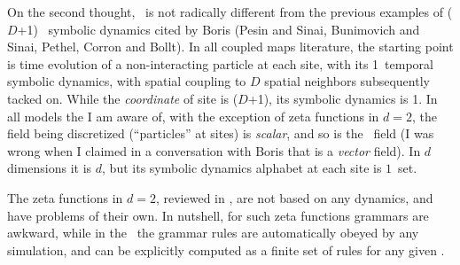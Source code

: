 \begin{description}
{On the second thought, \catlatt\ is not radically different from the previous
examples of ($D$+1)\dmn\ {\spt} symbolic dynamics cited by Boris
(Pesin and Sinai,
Bunimovich and Sinai,
Pethel, Corron and
Bollt).
In all coupled maps literature, the starting point is time evolution of a
non-interacting particle at each site, with its 1\dmn\ temporal symbolic
dynamics, with spatial coupling to $D$ spatial neighbors subsequently tacked
on. While the \emph{coordinate} of site is ($D$+1)\dmn, its symbolic dynamics
is 1\dmn. In all models the I am aware of, with the exception of zeta
functions in $d=2$, the field being discretized (``particles'' at sites) is
\emph{scalar}, and so is the \catlatt\ field (I was wrong when I claimed in a
conversation with Boris that is a \emph{vector} field). In $d$ {\spt}
dimensions it is $d$\dmn, but its symbolic dynamics alphabet at each site is
$1$\dmn\ set.

The zeta functions in $d=2$, reviewed in , are not based
on any dynamics, and have problems of their own. In nutshell, for such zeta
functions grammars are awkward, while in the \catlatt\ the grammar rules are
automatically obeyed by any simulation, and can be explicitly computed as a
finite set of rules for any given \twot.
    }





\end{description}
